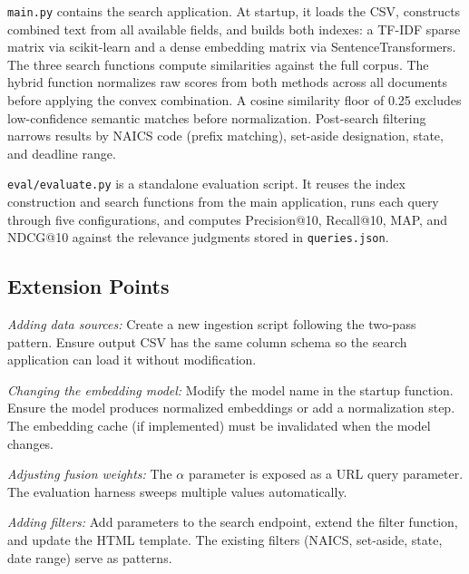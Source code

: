 \documentclass[10pt,twocolumn]{article}
\begin{document}
\texttt{main.py} contains the search application. At startup, it loads the CSV, constructs combined text from all available fields, and builds both indexes: a TF-IDF sparse matrix via scikit-learn and a dense embedding matrix via SentenceTransformers. The three search functions compute similarities against the full corpus. The hybrid function normalizes raw scores from both methods across all documents before applying the convex combination. A cosine similarity floor of 0.25 excludes low-confidence semantic matches before normalization. Post-search filtering narrows results by NAICS code (prefix matching), set-aside designation, state, and deadline range.

\texttt{eval/evaluate.py} is a standalone evaluation script. It reuses the index construction and search functions from the main application, runs each query through five configurations, and computes Precision@10, Recall@10, MAP, and NDCG@10 against the relevance judgments stored in \texttt{queries.json}.

\subsection{Extension Points}

\textit{Adding data sources:} Create a new ingestion script following the two-pass pattern. Ensure output CSV has the same column schema so the search application can load it without modification.

\textit{Changing the embedding model:} Modify the model name in the startup function. Ensure the model produces normalized embeddings or add a normalization step. The embedding cache (if implemented) must be invalidated when the model changes.

\textit{Adjusting fusion weights:} The $\alpha$ parameter is exposed as a URL query parameter. The evaluation harness sweeps multiple values automatically.

\textit{Adding filters:} Add parameters to the search endpoint, extend the filter function, and update the HTML template. The existing filters (NAICS, set-aside, state, date range) serve as patterns.
\end{document}
